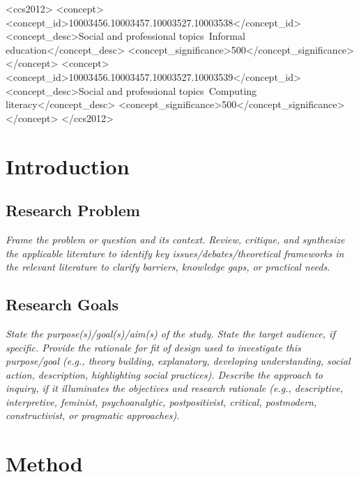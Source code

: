 \documentclass[acmsmall]{acmart}
\begin{document}
\begin{CCSXML}
<ccs2012>
<concept>
<concept_id>10003456.10003457.10003527.10003538</concept_id>
<concept_desc>Social and professional topics~Informal education</concept_desc>
<concept_significance>500</concept_significance>
</concept>
<concept>
<concept_id>10003456.10003457.10003527.10003539</concept_id>
<concept_desc>Social and professional topics~Computing literacy</concept_desc>
<concept_significance>500</concept_significance>
</concept>
</ccs2012>
\end{CCSXML}



\maketitle

\section{Introduction}

\subsection{Research Problem}
{\em\small Frame the problem or question and its context. Review, critique, and synthesize the applicable literature to identify key issues/debates/theoretical frameworks in the relevant literature to clarify barriers, knowledge gaps, or practical needs.}


\subsection{Research Goals}
{\em\small State the purpose(s)/goal(s)/aim(s) of the study. State the target audience, if specific. Provide the rationale for fit of design used to investigate this purpose/goal (e.g., theory building, explanatory, developing understanding, social action, description, highlighting social practices). Describe the approach to inquiry, if it illuminates the objectives and research rationale (e.g., descriptive, interpretive, feminist, psychoanalytic, postpositivist, critical, postmodern, constructivist, or pragmatic approaches).}

\section{Method}
\end{document}
